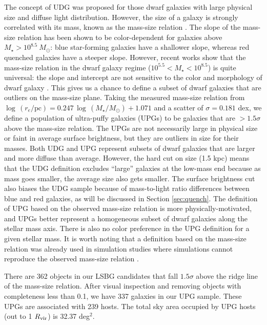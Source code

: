 \documentclass[twocolumn,astrosymb,twocolappendix]{aastex631}
\begin{document}
\begin{CJK*}{UTF8}{gbsn}
The concept of UDG was proposed for those dwarf galaxies with large physical size and diffuse light distribution. However, the size of a galaxy is strongly correlated with its mass, known as the mass-size relation \citep[e.g.,][]{Lange2015}. The slope of the mass-size relation has been shown to be color-dependent for galaxies above $M_\star > 10^{8.5}\ M_\odot$: blue star-forming galaxies have a shallower slope, whereas red quenched galaxies have a steeper slope. However, recent works show that the mass-size relation in the dwarf galaxy regime ($10^{5.5} < M_\star < 10^{8.5}$) is quite universal: the slope and intercept are not sensitive to the color and morphology of dwarf galaxy \citep{ELVES-I}. This gives us a chance to define a subset of dwarf galaxies that are outliers on the mass-size plane. Taking the measured mass-size relation from \citet{ELVES-I} $\log\, (r_e/\mathrm{pc}) = 0.247\, \log\, (M_\star/M_\odot) + 1.071$ and a scatter of $\sigma=0.181$ dex, we define a population of ultra-puffy galaxies (UPGs) to be galaxies that are $>1.5\sigma$ above the mass-size relation. The UPGs are not necessarily large in physical size or faint in average surface brightness, but they are outliers in size for their masses. Both UDG and UPG represent subsets of dwarf galaxies that are larger and more diffuse than average. However, the hard cut on size (1.5 kpc) means that the UDG definition excludes ``large'' galaxies at the low-mass end because as mass goes smaller, the average size also gets smaller. The surface brightness cut also biases the UDG sample because of mass-to-light ratio differences between blue and red galaxies, as will be discussed in Section \ref{sec:quench}. The definition of UPG based on the observed mass-size relation is more physically-motivated, and UPGs better represent a homogeneous subset of dwarf galaxies along the stellar mass axis. There is also no color preference in the UPG definition for a given stellar mass. It is worth noting that a definition based on the mass-size relation was already used in simulation studies where simulations cannot reproduce the observed mass-size relation \citep[e.g.,][]{Benavides2021}.

There are 362 objects in our LSBG candidates that fall $1.5\sigma$ above the ridge line of the mass-size relation. After visual inspection and removing objects with completeness less than 0.1, we have 337 galaxies in our UPG sample. These UPGs are associated with 239 hosts. The total sky area occupied by UPG hosts (out to 1 $R_{\rm{vir}}$) is 32.37 deg$^{2}$.



\end{CJK*}
\end{document}
